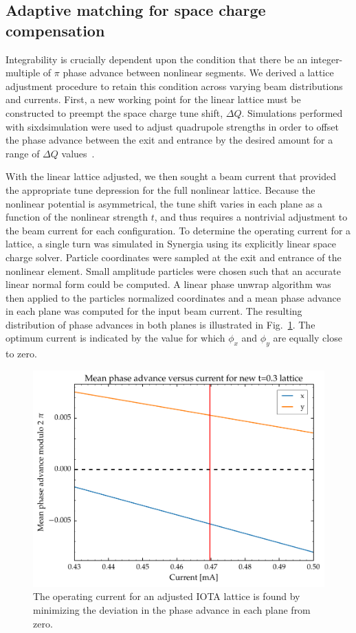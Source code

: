 \documentclass[aps,prstab,twocolumn, groupedaddress]{revtex4-1}
\begin{document}
\subsection{Adaptive matching for space charge compensation}

Integrability is crucially dependent upon the condition that there be an integer-multiple of 
$ \pi$ phase advance 
between nonlinear segments. We derived a lattice adjustment procedure to retain this 
condition across varying beam distributions and currents. First, a new working point for 
the linear lattice must be constructed to preempt the space charge tune shift, $\Delta Q$. 
Simulations performed with sixdsimulation were used to adjust quadrupole strengths in 
order to offset the phase advance between the exit and entrance by the desired amount 
for a range of $\Delta Q$ values~\cite{Romanov_2016}.

With the linear lattice adjusted, we then sought a beam current that provided the appropriate tune depression for the full nonlinear lattice. Because the nonlinear potential is asymmetrical, the tune shift varies in each plane as a function of the nonlinear strength $t$, and thus requires a nontrivial adjustment to the beam current for each configuration. To determine the operating current for a lattice, a single turn was simulated in Synergia using its explicitly linear space charge solver. Particle coordinates were sampled at the exit and entrance of the nonlinear element. Small amplitude particles were chosen such that an accurate linear normal form could be computed. A linear phase unwrap algorithm was then applied to the particles normalized coordinates and a mean phase advance in each plane was computed for the input beam current. The resulting distribution of phase advances in both planes is illustrated in Fig.~\ref{fig:phase_adjust}. The optimum current is indicated by the value for which $\phi_x$ and $\phi_y$ are equally close to zero.

\begin{figure}
	\includegraphics[width=\columnwidth]{adjusted_t0pt3phase.pdf}%
	\caption{\label{fig:phase_adjust} The operating current for an adjusted IOTA lattice is found by minimizing the deviation in the phase advance in each plane from zero.}
\end{figure}
\end{document}
